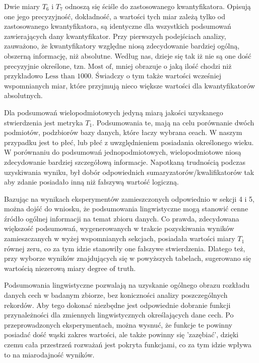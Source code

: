 \documentclass{classrep}
\begin{document}
Dwie miary $T_6$ i $T_7$ odnoszą się ściśle do zastosowanego kwantyfikatora. Opisują one jego precyzyjność, dokładność, a wartości tych miar zależą tylko od zastosowanego kwantyfikatora, są identyczne dla wszystkich podsumowań zawierających dany kwantyfikator. 
Przy pierwszych podejściach analizy, zauważono, że kwantyfikatory względne niosą zdecydowanie bardziej ogólną, obszerną informację,
niż absolutne. Według nas, dzieje się tak iż nie są one dość precyzyjnie określone, tzn. \(\text{Most of}\), mniej obrazuje o jaką ilość chodzi niż przykładowo \(\text{Less than 1000.}\) Świadczy o tym także wartości wcześniej wspomnianych miar, które przyjmują nieco większe wartości dla kwantyfikatorów absolutnych. 


Dla podsumowań wielopodmiotowych jedyną miarą jakości uzyskanego stwierdzenia jest metryka $T_1$. Podsumowania te, mają na celu porównanie dwóch podmiotów, podzbiorów bazy danych, które łaczy wybrana ceach. W naszym przypadku jest to płeć, lub płeć z uwzględnieniem posiadania określonego wieku. 
W porównaniu do podsumowań jednopodmiotowych, wielopodmiotowe niosą zdecydowanie bardziej szczegółową informacje. Napotkaną trudnością podczas uzyskiwania wyniku, był dobór odpowiednich sumaryzatorów/kwalifikatorów tak aby zdanie posiadało inną niż fałszywą wartość logiczną. 


Bazując na wynikach eksperymentów zamieszczonych odpowiednio w sekcji 4 i 5, można dojść do wniosku, że podsumowania lingwistyczne
mogą stanowić cenne źródło ogólnej informacji na temat zbioru danych. Co prawda, zdecydowana większość podsumowań, wygenerowanych w trakcie pozyskiwania wyników zamieszczanych w wyżej 
wspomnianych sekcjach, posiadała wartości miary \(T_1\) równej zeru, co za tym idzie stanowiły one fałszywe stwierdzenia. Dlatego też, przy wyborze wyników znajdujących się w powyższych tabelach, sugerowano się 
wartością niezerową miary \(\text{degree of truth}\).

Podsumowania lingwistyczne pozwalają na uzyskanie ogólnego obrazu rozkładu danych cech w badanym zbiorze, bez koniczności analizy poszczególnych rekordów. Aby tego dokonać niezbędne jest odpowiednie dobranie funkcji przynależności
dla zmiennych lingwistycznych określających dane cech. Po przeprowadzonych eksperymentach, można wysnuć, że funkcje te powinny posiadać dość wąski zakres wartości, ale także powinny się 'zazębiać', dzięki czemu cała przestrzeń rozważań jest pokryta funkcjami, co za tym idzie wpływa to na miarodajność wyników.
\end{document}
